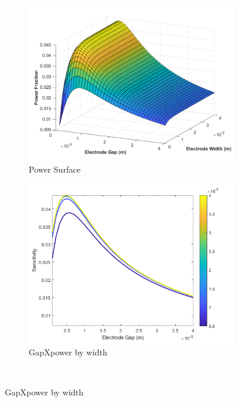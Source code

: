 \begin{figure}[h]
    \centering
    \begin{subfigure}[b]{0.49\textwidth}
        \centering
        \includegraphics[width=\textwidth]{images/analytic_power_surface.png}
        \caption{Power Surface}
    \end{subfigure}
    \hfill
    \begin{subfigure}[b]{0.49\textwidth}
        \centering
        \includegraphics[width=\textwidth]{images/analytic_gapXpower.png}
        \caption{GapXpower by width}
    \end{subfigure}
    \\
    \vspace{0.1 in}

\end{figure}
